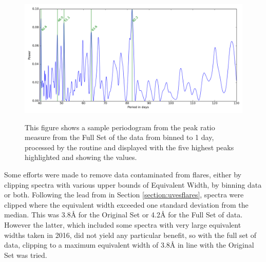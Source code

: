 \begin{figure}[!htbp]
\begin{center}
\includegraphics[scale=0.40]{Figures/harpsprbind1.png} \\
\end{center}   
\caption{This figure shows a sample periodogram from the peak ratio measure from the Full Set of the data from {\harps}
  binned to 1 day, processed by the {\gatspy} routine and displayed with the five highest peaks highlighted and showing
  the values. }
\protect\label{fig:harpspgrams2}
\end{figure}

Some efforts were made to remove data contaminated from flares, either by clipping spectra with various upper bounds of
Equivalent Width, by binning data or both. Following the lead from {\uves} in Section \ref{section:uvesflares}, spectra
were clipped where the equivalent width exceeded one standard deviation from the median. This was 3.8{\AA} for the
Original Set or 4.2{\AA} for the Full Set of data. However the latter, which included some spectra with very large
equivalent widths taken in 2016, did not yield any particular benefit, so with the full set of data, clipping to a
maximum equivalent width of 3.8{\AA} in line with the Original Set was tried. 

